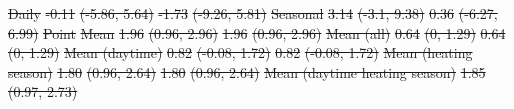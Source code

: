 \documentclass[
  letterpaper,
  DIV=11,
  numbers=noendperiod]{scrartcl}
\makeatletter
\renewenvironment{table}%
   {\renewcommand\familydefault\sfdefault
    \@float{table}}
   {\end@float}
\providecommand{\DIFdeltex}[1]{{\protect\color{red}\sout{#1}}}                      %
\providecommand{\DIFdelFL}[1]{\DIFdel{#1}} %
\providecommand{\DIFdel}[1]{\texorpdfstring{\DIFdeltex{#1}}{}} %
\makeatother
\begin{document}
\begin{table}
\DIFdelFL{\hspace{1em} }%
\DIFdelFL{Daily }%
\DIFdelFL{-0.11 }%
\DIFdelFL{(-5.86, 5.64) }%
\DIFdelFL{-1.73 }%
\DIFdelFL{(-9.26, 5.81)}%
\DIFdelFL{Seasonal }%
\DIFdelFL{3.14 }%
\DIFdelFL{(-3.1, 9.38) }%
\DIFdelFL{0.36 }%
\DIFdelFL{(-6.27, 6.99)}%
\DIFdelFL{\hspace{1em}Point }%
\DIFdelFL{Mean }%
\DIFdelFL{1.96 }%
\DIFdelFL{(0.96, 2.96) }%
\DIFdelFL{1.96 }%
\DIFdelFL{(0.96, 2.96)}%
\DIFdelFL{\hspace{1em} }%
\DIFdelFL{Mean (all) }%
\DIFdelFL{0.64 }%
\DIFdelFL{(0, 1.29) }%
\DIFdelFL{0.64 }%
\DIFdelFL{(0, 1.29)}%
\DIFdelFL{\hspace{1em} }%
\DIFdelFL{Mean (daytime) }%
\DIFdelFL{0.82 }%
\DIFdelFL{(-0.08, 1.72) }%
\DIFdelFL{0.82 }%
\DIFdelFL{(-0.08, 1.72)}%
\DIFdelFL{\hspace{1em} }%
\DIFdelFL{Mean (heating season) }%
\DIFdelFL{1.80 }%
\DIFdelFL{(0.96, 2.64) }%
\DIFdelFL{1.80 }%
\DIFdelFL{(0.96, 2.64)}%
\DIFdelFL{\hspace{1em} }%
\DIFdelFL{Mean (daytime heating season) }%
\DIFdelFL{1.85 }%
\DIFdelFL{(0.97, 2.73) }%

\end{table}
\end{document}
